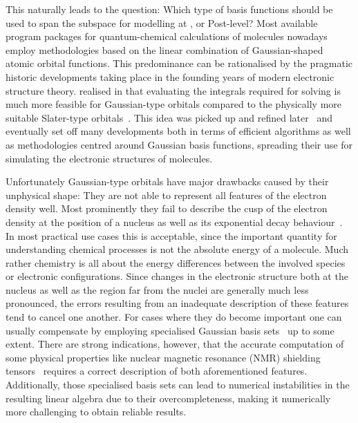 This naturally leads to the question:
Which type of basis functions should be used to span the subspace
for modelling at \HF, \DFT or Post-\HF level?
Most available program packages for
quantum-chemical calculations of molecules nowadays employ methodologies based on
the linear combination of Gaussian-shaped atomic orbital functions.
This predominance can be rationalised
by the pragmatic historic developments
taking place in the founding years of modern electronic structure theory.
\citet{Boys1950} realised in \citeyear{Boys1950}
that evaluating the integrals
required for solving \HF is much more feasible for Gaussian-type orbitals
compared to the physically more suitable Slater-type orbitals~\cite{Slater1930}.
This idea was picked up and refined later~\cite{Hehre1969}
and eventually set off many developments
both in terms of efficient algorithms as well as methodologies
centred around Gaussian basis functions,
spreading their use for simulating the electronic structures of molecules.

Unfortunately Gaussian-type orbitals have major drawbacks
caused by their unphysical shape:
They are not able to represent
all features of the electron density well.
Most prominently they fail to describe the cusp of the electron density
at the position of a nucleus as well as its exponential decay behaviour~\cite{Kato1957}.
In most practical use cases this is acceptable,
since the important quantity for understanding chemical processes
is not the absolute energy of a molecule.
Much rather chemistry is all about the energy differences
between the involved species or electronic configurations.
Since changes in the electronic structure both at the nucleus as well as
the region far from the nuclei are generally much less pronounced,
the errors resulting from an inadequate description
of these features tend to cancel one another.
For cases where they do become important
one can usually compensate by employing specialised Gaussian
basis sets~\cite{Jensen2013,Hill2013} up to some extent.
There are strong indications, however,
that the accurate computation of some physical properties
like nuclear magnetic resonance (NMR) shielding tensors~\cite{Guell2008,Hoggan2009}
requires a correct description of both aforementioned features.
Additionally, those specialised basis sets can lead to
numerical instabilities in the resulting linear algebra due to their overcompleteness,
making it numerically more challenging to obtain reliable results.

